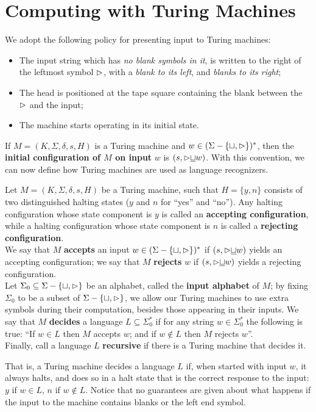 \section{Computing with Turing Machines}
\label{sec:compute-w-tm}

We adopt the following policy for presenting input to Turing machines: 
\begin{itemize}
  \item The input string which has \textit{no blank symbols in it}, is written to the right of the leftmost symbol $\vartriangleright$, with a \textit{blank to its left}, and \textit{blanks to its right}; 
  \item The head is positioned at the tape square containing the blank between the $\vartriangleright$ and the input; 
  \item The machine starts operating in its initial state.
\end{itemize}
If $M = (K, \Sigma, \delta, s, H)$ is a Turing machine and $w \in (\Sigma - \{ \sqcup, \vartriangleright \})^*$, then the \textbf{initial configuration of $M$ on input} $w$ is $(s, {\vartriangleright}{\underline{\sqcup}}w)$. With this convention, we can now define how Turing machines are used as language recognizers.

\begin{definition}{}
\quad Let $M = (K, \Sigma, \delta, s, H)$ be a Turing machine, such that $H = \{ y, n \}$ consists of two distinguished halting states ($y$ and $n$ for ``yes'' and ``no''). Any halting configuration whose state component is $y$ is called an \textbf{accepting configuration}, while a halting configuration whose state component is $n$ is called a \textbf{rejecting configuration}. \\

We say that $M$ \textbf{accepts} an input $w \in (\Sigma - \{ \sqcup, \vartriangleright \})^*$ if $(s, {\vartriangleright}{\underline{\sqcup}}w)$ yields an accepting configuration; we say that $M$ \textbf{rejects} $w$ if $(s, {\vartriangleright}{\underline{\sqcup}}w)$ yields a rejecting configuration. \\

\quad Let $\Sigma_0 \subseteq \Sigma - \{ \sqcup, \vartriangleright \}$ be an alphabet, called the \textbf{input alphabet} of $M$; by fixing $\Sigma_0$ to be a subset of $\Sigma - \{ \sqcup, \vartriangleright \}$, we allow our Turing machines to use extra symbols during their computation, besides those appearing in their inputs. We say that $M$ \textbf{decides} a language $L \subseteq \Sigma_0^*$ if for any string $w \in \Sigma_0^*$ the following is true: ``If $w \in L$ then $M$ accepts $w$; and if $w \notin L$ then $M$ rejects $w$''. \\

\quad Finally, call a language $L$ \textbf{recursive} if there is a Turing machine that decides it.
\end{definition}
That is, a Turing machine decides a language $L$ if, when started with input $w$, it always halts, and does so in a halt state that is the correct response to the input: $y$ if $w \in L$, $n$ if $w \notin L$. Notice that no guarantees are given about what happens if the input to the machine contains blanks or the left end symbol.

